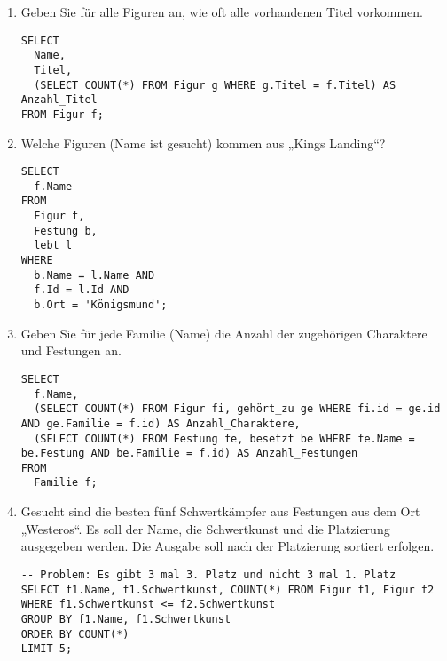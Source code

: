 \documentclass{lehramt-informatik-aufgabe}
\begin{document}
\begin{enumerate}

%

\item Geben Sie für alle Figuren an, wie oft alle vorhandenen Titel
vorkommen.

\begin{liAntwort}
\begin{verbatim}
SELECT
  Name,
  Titel,
  (SELECT COUNT(*) FROM Figur g WHERE g.Titel = f.Titel) AS Anzahl_Titel
FROM Figur f;
\end{verbatim}
\end{liAntwort}

%

\item Welche Figuren (Name ist gesucht) kommen aus „Kings Landing“?

\begin{liAntwort}
\begin{verbatim}
SELECT
  f.Name
FROM
  Figur f,
  Festung b,
  lebt l
WHERE
  b.Name = l.Name AND
  f.Id = l.Id AND
  b.Ort = 'Königsmund';
\end{verbatim}
\end{liAntwort}

%

\item Geben Sie für jede Familie (Name) die Anzahl der zugehörigen
Charaktere und Festungen an.

\begin{liAntwort}
\begin{verbatim}
SELECT
  f.Name,
  (SELECT COUNT(*) FROM Figur fi, gehört_zu ge WHERE fi.id = ge.id AND ge.Familie = f.id) AS Anzahl_Charaktere,
  (SELECT COUNT(*) FROM Festung fe, besetzt be WHERE fe.Name = be.Festung AND be.Familie = f.id) AS Anzahl_Festungen
FROM
  Familie f;
\end{verbatim}
\end{liAntwort}

%

\item Gesucht sind die besten fünf Schwertkämpfer aus Festungen aus dem
Ort „Westeros“. Es soll der Name, die Schwertkunst und die Platzierung
ausgegeben werden. Die Ausgabe soll nach der Platzierung sortiert
erfolgen.

\begin{liAntwort}
\begin{verbatim}
-- Problem: Es gibt 3 mal 3. Platz und nicht 3 mal 1. Platz
SELECT f1.Name, f1.Schwertkunst, COUNT(*) FROM Figur f1, Figur f2
WHERE f1.Schwertkunst <= f2.Schwertkunst
GROUP BY f1.Name, f1.Schwertkunst
ORDER BY COUNT(*)
LIMIT 5;
\end{verbatim}
\end{liAntwort}


\end{enumerate}
\end{document}
